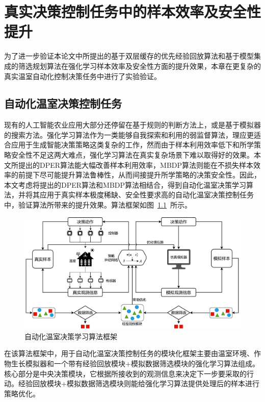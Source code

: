 
\chapter{真实决策控制任务中的样本效率及安全性提升}\label{chap:greenhouse}

为了进一步验证本论文中所提出的基于双层缓存的优先经验回放算法和基于模型集成的筛选规划算法在强化学习样本效率及安全性方面的提升效果，本章在更复杂的真实温室自动化控制决策任务中进行了实验验证。

\section{自动化温室决策控制任务}

现有的人工智能农业应用大部分还停留在基于规则的判断方法上，或是基于模拟器的搜索方法\cite{cao2021igrow,an2021simulator}。强化学习算法作为一类能够自我探索和利用的弱监督算法，理应更适合应用于生成智能决策策略这类复杂的工作，然而由于样本利用效率低下和所学策略安全性不足这两大难点\cite{zhang2021robust}，强化学习算法在真实复杂场景下难以取得好的效果。本文所提出的DPER算法能大幅改善样本利用效率，MBDP算法则能在不损失样本效率的前提下尽可能提升算法鲁棒性，从而间接提升所学策略的决策安全性。因此，本文考虑将提出的DPER算法和MBDP算法相结合，得到自动化温室决策学习算法，并将其应用于真实样本极度稀缺、安全性要求高的自动化温室决策控制任务中，验证算法所带来的提升效果。算法框架如图~\ref{fig:framework}~所示。

\begin{figure}[ht]
\centering
\includegraphics[width=\textwidth]{figures/framework.pdf}
\caption{自动化温室决策学习算法框架}
\label{fig:framework}
\end{figure}

在该算法框架中，用于自动化温室决策控制任务的模块化框架主要由温室环境、作物生长模拟器和一个带有经验回放模块+模拟数据筛选模块的强化学习算法组成。核心部分是中央决策模块，它根据所接收到的观测信息来决定下一步要采取的行动。经验回放模块+模拟数据筛选模块则能给强化学习算法提供处理后的样本进行策略优化。

